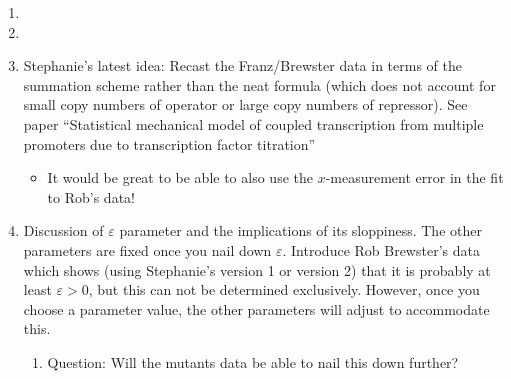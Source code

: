 \begin{enumerate}
	\item {}
	
	\item {}
	
	\item Stephanie's latest idea: Recast the Franz/Brewster data in terms of the
	summation scheme rather than the neat formula (which does not account for small
	copy numbers of operator or large copy numbers of repressor). See paper
	``Statistical mechanical model of coupled transcription from multiple promoters
	due to transcription factor titration'' \begin{itemize} \item It would be great
		to be able to also use the $x$-measurement error in the fit to Rob's data!
	\end{itemize}
	
	\item Discussion of $\varepsilon$ parameter and the implications of its
	sloppiness. The other parameters are fixed once you nail down $\varepsilon$.
	Introduce Rob Brewster's data  which shows (using Stephanie's version 1 or
	version 2) that it is probably at least $\varepsilon > 0$, but this can not be
	determined exclusively. However, once you choose a parameter value, the other
	parameters will adjust to accommodate this. \begin{enumerate} \item Question:
		Will the mutants data be able to nail this down further? \end{enumerate}
	

\end{enumerate}
